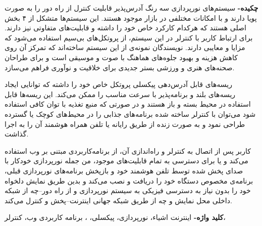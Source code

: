 \documentclass[12pt,twocolumn,a4paper,oneside]{article}
\title{\vspace{-8mm}{\centering\titlefa\par}\lr\titleen}
\author{%
  \makeauthor{\authorfa}{mamins1376@gmail.com}{۰۹۳۹۴۴۵۳۳۴۷}\and%
  \makeauthor{\rawsupervisorfa}{hkhoshniyat@arakut.ac.ir}{۰۸۶۳۳۴۰۰۶۱۴}}
\date{}
\begin{document}
%

{\bfseries{چکیده-}}
سیستم‌های نورپردازی سه رنگ آدرس‌پذیر قابلیت کنترل از راه دور را به صورت پویا دارند و با امکانات مختلفی در بازار موجود هستند. این سیستم‌ها متشکل از ۴ بخش اصلی هستند که هرکدام کارکرد خاص خود را داشته و قابلیت‌های متفاوتی نیز دارند. برای ارتباط کاربر با کنترلر در این سیستم، از پروتکل‌های بی‌سیم استفاده می‌شود که مزایا و معایبی دارند. نویسندگان نمونه‌ی از این سیستم ساخته‌اند که تمرکز آن روی کاهش هزینه و بهبود جلوه‌های هماهنگ با صوت و موسیقی است و برای طراحان صحنه‌های هنری و ورزشی بستر جدیدی برای خلاقیت و نوآوری فراهم می‌سازد. 

ریسه‌های قابل آدرس‌دهی پیکسلی پروتکل خاص خود را داشته که توانایی ایجاد ریسه‌های بلند و برنامه‌پذیر با سرعت مناسب را ممکن می‌کند. این  ریسه‌ها قابل استفاده در محیط بسته و باز هستند و در صورتی که منبع تغذیه با توان کافی استفاده شود می‌توان با کنترلر ساخته شده برنامه‌های جذابی را در محیط‌های کوچک یا گسترده طراحی نمود و به صورت زنده از طریق رایانه یا تلفن همراه هوشمند آن را به اجرا گذاشت.

کاربر پس از اتصال به کنترلر و راه‌اندازی آن، از برنامه‌کاربردی مبتنی بر وب استفاده می‌کند و یا برای دسترسی به تمام قابلیت‌های موجود، من جمله نورپردازی خودکار با صدای پخش شده توسط تلفن هوشمند خود و بازپخش برنامه‌های نورپردازی قبلی، برنامه‌ی مخصوص دستگاه خود را دریافت و نصب می‌کند و بدین طریق نمایش دلخواه خود را بدون نیاز به دسترسی فیزیکی به سیستم نورپردازی و از راه دور--چه از شبکه داخلی محل نمایش و چه از طریق شبکه جهانی اینترنت--پخش و کنترل می‌کند.

{\bfseries{کلید واژه-}}
اینترنت اشیاء، نورپردازی،
 پیکسلی، 
،
برنامه کاربردی وب، کنترلر،
\end{document}

